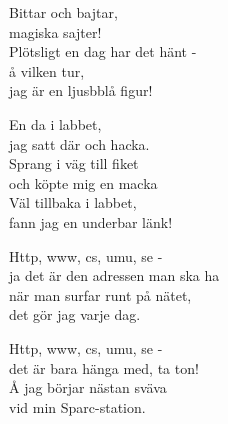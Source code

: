 {\footnotesize{}}\par
\vspace{10pt}
Bittar och bajtar,\\
magiska sajter!\\
Plötsligt en dag har det hänt -\\
å vilken tur,\\
jag är en ljusbblå figur!\par
\vspace{10pt}
En da i labbet,\\
jag satt där och hacka.\\
Sprang i väg till fiket\\
och köpte mig en macka\\
Väl tillbaka i labbet,\\
fann jag en underbar länk!\par
\vspace{10pt}
Http, www, cs, umu, se -\\
ja det är den adressen man ska ha\\
när man surfar runt på nätet,\\
det gör jag varje dag.\par
\vspace{10pt}
Http, www, cs, umu, se -\\
det är bara hänga med, ta ton!\\
Å jag börjar nästan sväva\\
vid min Sparc-station.\par
\vspace{10pt}
{\footnotesize{}}
